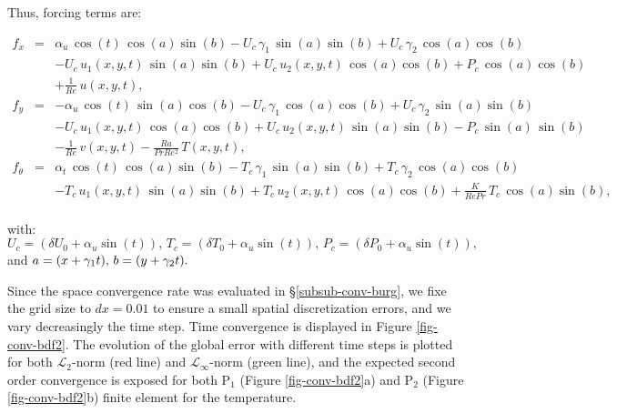 \noindent Thus, forcing terms are:

\begin{eqnarray}
	f_x &=& \alpha_u \, \cos(t) \, \cos(a) \sin(b) - U_c \, \gamma_1 \, \sin(a) \sin(b) + U_c \, \gamma_2  \, \cos(a)\cos(b) \\ \nonumber
	  & & - U_c \,  u_1(x,y,t) \, \sin(a) \sin(b) + U_c \,  u_2(x,y,t) \, \cos(a) \cos(b)
	  + P_c \, \cos(a) \cos(b)\\ \nonumber
	  & & + \frac{1}{Re} \, u(x,y,t), \\	  \nonumber
	f_y &=& - \alpha_u \,  \cos(t)  \, \sin(a) \cos(b) - U_c \,  \gamma_1  \,  \cos(a) \cos(b) + U_c \,  \gamma_2 \,  \sin(a)\sin(b) \\ \nonumber
		  & & - U_c \,  u_1(x,y,t)  \,  \cos(a) \cos(b) + U_c  \, u_2(x,y,t)  \,  \sin(a) \sin(b)
		  -  P_c  \,  \sin(a)  \,  \sin(b)\\ \nonumber
		  & & -\frac{1}{Re} \,  v(x,y,t)
		  - \frac{Ra}{Pr Re^2} \,  T(x,y,t), \\  \nonumber
	f_{\theta} &=& \alpha_t \,  \cos(t) \,  \cos(a) \sin(b) -  T_c  \,  \gamma_1 \,  \sin(a) \sin(b) + T_c \,   \gamma_2  \,  \cos(a)\cos(b) \\ \nonumber
		  & &-  T_c \,  u_1(x,y,t)  \,  \sin(a) \sin(b)  
		  +   T_c  \,  u_2(x,y,t)  \, \cos(a) \cos(b) 
		  + \frac{K}{Re Pr} \,  T_c  \, \cos(a) \sin(b), \\ \nonumber
\end{eqnarray}

with: 
$	U_c = (\delta U_0 + \alpha_u \sin(t)), \,
	T_c = (\delta T_0 + \alpha_u \sin(t)), \,
	P_c = (\delta P_0 + \alpha_u \sin(t)), $ \\
and $	a = (x+ \gamma_1 t), \,
	b = (y+ \gamma_2 t). \\$

Since the space convergence rate was evaluated in \S \ref{subsub-conv-burg}, we fixe the grid size to $dx = 0.01$ to ensure a small spatial discretization errors, and we vary decreasingly the time step.
Time convergence is displayed in Figure \ref{fig-conv-bdf2}. 
The evolution of the global error with different time steps is plotted for both  $\mathcal{L}_2$-norm (red line) and $\mathcal{L}_\infty$-norm (green line), and the expected second order convergence is exposed for both P$_1$ (Figure \ref{fig-conv-bdf2}a) and P$_2$ (Figure \ref{fig-conv-bdf2}b) finite element for the temperature.


